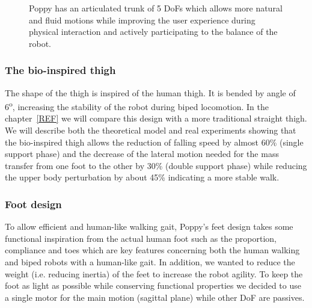 \begin{figure}[]
\centering
    \hfil
    \caption{Poppy has an articulated trunk of 5 DoFs which allows more natural and fluid motions while improving the user experience during physical interaction and actively participating to the balance of the robot.}
    \label{fig:poppy_multi_articulated_trunk}
\end{figure}


\subsubsection{The bio-inspired thigh} %
The shape of the thigh is inspired of the human thigh. It is bended by angle of 6\textsuperscript{o}, increasing the stability of the robot during biped locomotion. In the chapter~\ref{REF} we will compare this design with a more traditional straight thigh. We will describe both the theoretical model and real experiments showing that the bio-inspired thigh allows the reduction of falling speed by almost 60\% (single support phase) and the decrease of the lateral motion needed for the mass transfer from one foot to the other by 30\% (double support phase) while reducing the upper body perturbation by about 45\% indicating a more stable walk.

\subsubsection{Foot design} %

To allow efficient and human-like walking gait, Poppy's feet design takes some functional inspiration from the actual human foot such as the proportion, compliance and toes which are key features concerning both the human walking and biped robots with a human-like gait. In addition, we wanted to reduce the weight (i.e. reducing inertia) of the feet to increase the robot agility. To keep the foot as light as possible while conserving functional properties we decided to use a single motor for the main motion (sagittal plane) while other DoF are passives.


